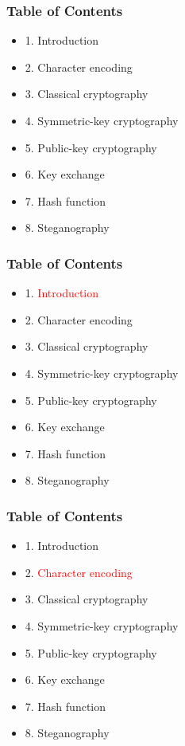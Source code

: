 \documentclass[handout, xcolor=dvipsnames,aspectratio=169]{beamer}
\begin{document}
\begin{frame}
  \centering
  \frametitle{Table of Contents}
  \begin{itemize}
    \item 1. Introduction
    \item 2. Character encoding
    \item 3. Classical cryptography
    \item 4. Symmetric-key cryptography
    \item 5. Public-key cryptography
    \item 6. Key exchange
    \item 7. Hash function
    \item 8. Steganography
  \end{itemize}  
\end{frame}
\begin{frame}
  \centering
  \frametitle{Table of Contents}
  \begin{itemize}
    \item 1. \textcolor{red}{Introduction}
    \item 2. Character encoding
    \item 3. Classical cryptography
    \item 4. Symmetric-key cryptography
    \item 5. Public-key cryptography
    \item 6. Key exchange
    \item 7. Hash function
    \item 8. Steganography
  \end{itemize}  
\end{frame}

\begin{frame}
  \centering
  \frametitle{Table of Contents}
  \begin{itemize}
    \item 1. Introduction
    \item 2. \textcolor{red}{Character encoding}
    \item 3. Classical cryptography
    \item 4. Symmetric-key cryptography
    \item 5. Public-key cryptography
    \item 6. Key exchange
    \item 7. Hash function
    \item 8. Steganography
  \end{itemize}  
\end{frame}
\end{document}
